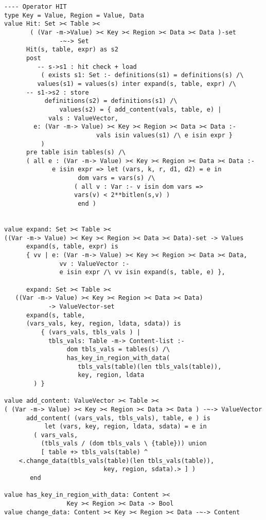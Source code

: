{\begin{lstlisting}
---- Operator HIT
type Key = Value, Region = Value, Data
value Hit: Set >< Table ><
       ( (Var -m->Value) >< Key >< Region >< Data >< Data )-set
               -~-> Set
      Hit(s, table, expr) as s2
      post
         -- s->s1 : hit check + load
          ( exists s1: Set :- definitions(s1) = definitions(s) /\
         values(s1) = values(s) inter expand(s, table, expr) /\
	  -- s1->s2 : store
	       definitions(s2) = definitions(s1) /\
               values(s2) = { add_content(vals, table, e) |
			vals : ValueVector,
        e: (Var -m-> Value) >< Key >< Region >< Data >< Data :-
                         vals isin values(s1) /\ e isin expr }
          )
      pre table isin tables(s) /\
	  ( all e : (Var -m-> Value) >< Key >< Region >< Data >< Data :-
             e isin expr => let (vars, k, r, d1, d2) = e in
                    dom vars = vars(s) /\
                   ( all v : Var :- v isin dom vars =>
                   vars(v) < 2**bitlen(s,v) )
					end )


value expand: Set >< Table ><
((Var -m-> Value) >< Key >< Region >< Data >< Data)-set -> Values
      expand(s, table, expr) is
      { vv | e: (Var -m-> Value) >< Key >< Region >< Data >< Data,
               vv : ValueVector :-
               e isin expr /\ vv isin expand(s, table, e) },

      expand: Set >< Table ><
   ((Var -m-> Value) >< Key >< Region >< Data >< Data)
            -> ValueVector-set
      expand(s, table,
      (vars_vals, key, region, ldata, sdata)) is
          { (vars_vals, tbls_vals ) |
            tbls_vals: Table -m-> Content-list :-
                 dom tbls_vals = tables(s) /\
                 has_key_in_region_with_data(
                    tbls_vals(table)(len tbls_vals(table)),
                    key, region, ldata
		) }

value add_content: ValueVector >< Table ><
( (Var -m-> Value) >< Key >< Region >< Data >< Data ) -~-> ValueVector
      add_content( (vars_vals, tbls_vals), table, e ) is
           let (vars, key, region, ldata, sdata) = e in
		( vars_vals,
		  (tbls_vals / (dom tbls_vals \ {table})) union
		  [ table +> tbls_vals(table) ^
    <.change_data(tbls_vals(table)(len tbls_vals(table)),
                           key, region, sdata).> ] )
	   end

value has_key_in_region_with_data: Content ><
                 Key >< Region >< Data -> Bool
value change_data: Content >< Key >< Region >< Data -~-> Content



\end{lstlisting}}
